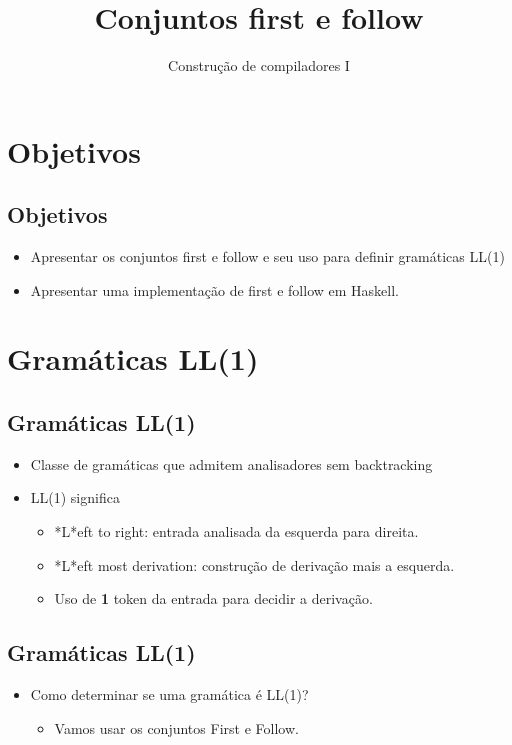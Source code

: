 \documentclass[11pt]{article}
\author{Construção de compiladores I}
\date{}
\title{Conjuntos first e follow}
\begin{document}
\maketitle
\section*{Objetivos}
\label{sec:org8d6932c}

\subsection*{Objetivos}
\label{sec:org01dff8a}

\begin{itemize}
\item Apresentar os conjuntos first e follow e seu uso para definir gramáticas LL(1)

\item Apresentar uma implementação de first e follow em Haskell.
\end{itemize}
\section*{Gramáticas LL(1)}
\label{sec:org205e540}

\subsection*{Gramáticas LL(1)}
\label{sec:org97e6725}

\begin{itemize}
\item Classe de gramáticas que admitem analisadores sem backtracking

\item LL(1) significa
\begin{itemize}
\item *L*eft to right: entrada analisada da esquerda para direita.
\item *L*eft most derivation: construção de derivação mais a esquerda.
\item Uso de \textbf{1} token da entrada para decidir a derivação.
\end{itemize}
\end{itemize}
\subsection*{Gramáticas LL(1)}
\label{sec:orgcad0bd2}

\begin{itemize}
\item Como determinar se uma gramática é LL(1)?
\begin{itemize}
\item Vamos usar os conjuntos First e Follow.
\end{itemize}
\end{itemize}
\end{document}
